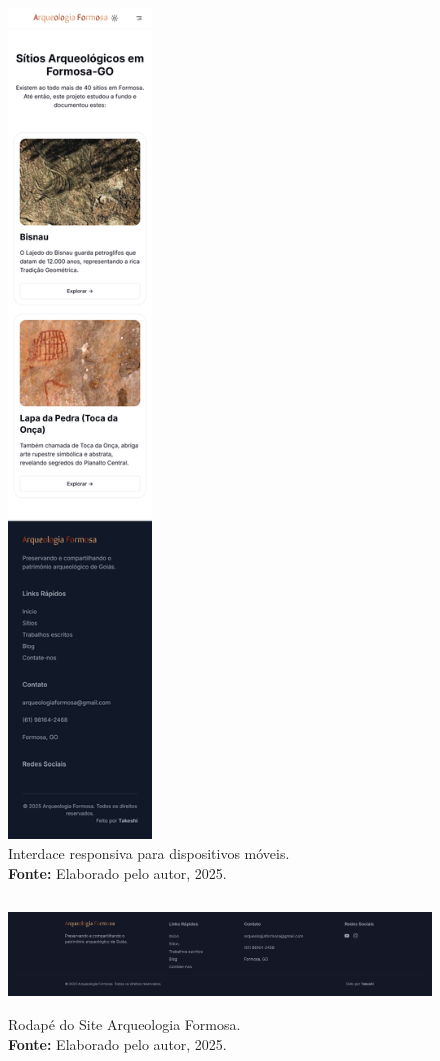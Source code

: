                     \begin{figure}[H]
                        \centering
                        \includegraphics[height=22cm, keepaspectratio]{img/site/site mobile.png}
                        \caption{ Interdace responsiva para dispositivos móveis.  \\
                            \textbf{Fonte:} Elaborado pelo autor, 2025.}
                        \label{fig:responsivo1}
                    \end{figure}

\begin{figure}[H]
    \centering
    \includegraphics[height=3cm, keepaspectratio]{img/site/footer.png}
    \caption{Rodapé do Site Arqueologia Formosa. \\
    \textbf{Fonte:} Elaborado pelo autor, 2025.}
    \label{fig:footer}
\end{figure}

